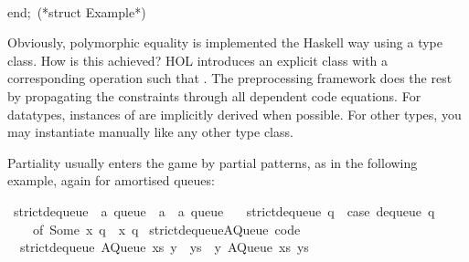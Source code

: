 \begin{isabellebody}
\begin{isamarkuptext}
\hspace*{0pt}\\
\hspace*{0pt}end;~(*struct Example*)%
\end{isamarkuptext}%
\isamarkuptrue%
%
\endisatagquote
{\isafoldquote}%
%
\isadelimquote
%
\endisadelimquote
%
\begin{isamarkuptext}%
\noindent Obviously, polymorphic equality is implemented the Haskell
  way using a type class.  How is this achieved?  HOL introduces
  an explicit class  with a corresponding operation
   such that .
  The preprocessing framework does the rest by propagating the
   constraints through all dependent code equations.
  For datatypes, instances of  are implicitly derived
  when possible.  For other types, you may instantiate 
  manually like any other type class.%
\end{isamarkuptext}%
\isamarkuptrue%
%
\isamarkuptrue%
%
\begin{isamarkuptext}%
Partiality usually enters the game by partial patterns, as
  in the following example, again for amortised queues:%
\end{isamarkuptext}%
\isamarkuptrue%
%
\isadelimquote
%
\endisadelimquote
%
\isatagquote
{}\isamarkupfalse%
\ strict{\isacharunderscore}dequeue\ {\isacharcolon}{\isacharcolon}\ {\isachardoublequoteopen}{\isacharprime}a\ queue\ {\isasymRightarrow}\ {\isacharprime}a\ {\isasymtimes}\ {\isacharprime}a\ queue{\isachardoublequoteclose}\ \isanewline
\ \ {\isachardoublequoteopen}strict{\isacharunderscore}dequeue\ q\ {\isacharequal}\ {\isacharparenleft}case\ dequeue\ q\isanewline
\ \ \ \ of\ {\isacharparenleft}Some\ x{\isacharcomma}\ q{\isacharprime}{\isacharparenright}\ {\isasymRightarrow}\ {\isacharparenleft}x{\isacharcomma}\ q{\isacharprime}{\isacharparenright}{\isacharparenright}{\isachardoublequoteclose}\isanewline
\isanewline
{}\isamarkupfalse%
\ strict{\isacharunderscore}dequeue{\isacharunderscore}AQueue\ {\isacharbrackleft}code{\isacharbrackright}{\isacharcolon}\isanewline
\ \ {\isachardoublequoteopen}strict{\isacharunderscore}dequeue\ {\isacharparenleft}AQueue\ xs\ {\isacharparenleft}y\ {\isacharhash}\ ys{\isacharparenright}{\isacharparenright}\ {\isacharequal}\ {\isacharparenleft}y{\isacharcomma}\ AQueue\ xs\ ys{\isacharparenright}{\isachardoublequoteclose}\isanewline

\end{isabellebody}
